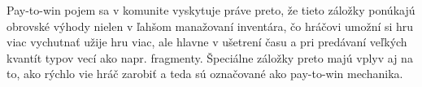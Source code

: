 \documentclass[10pt,twoside,slovak,a4paper]{article}
\begin{document}
Pay-to-win pojem sa v komunite vyskytuje práve preto, že tieto záložky ponúkajú obrovské výhody nielen v ľahšom manažovaní inventára, čo hráčovi umožní si hru viac vychutnať užije hru viac, ale hlavne v ušetrení času a pri predávaní veľkých kvantít typov vecí ako napr. fragmenty. Špeciálne záložky preto majú vplyv aj na to, ako rýchlo vie hráč zarobiť a teda sú označované ako pay-to-win mechanika.





\nocite{*}


\end{document}
